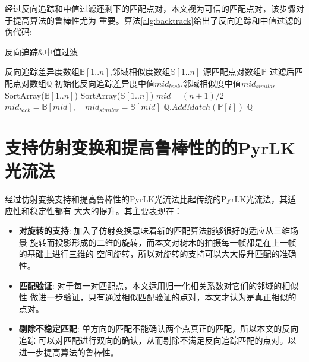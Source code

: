 经过反向追踪和中值过滤还剩下的匹配点对，本文视为可信的匹配点对，该步骤对于提高算法的鲁棒性尤为
重要。算法\ref{alg:backtrack}给出了反向追踪和中值过滤的伪代码:\\
\begin{algorithm}[H]
	\caption{反向追踪\&中值过滤}
	\label{alg:backtrack}
	\begin{algorithmic}[1]
	\Require 反向追踪差异度数组$\mathbb{B}[1..n]$,邻域相似度数组$\mathbb{S}[1..n]$
	\Require 源匹配点对数组$\mathbb{P}$
	\Ensure 过滤后匹配点对数组$\mathbb{Q}$
	\State 初始化反向追踪差异度中值$mid_{back}$,邻域相似度中值$mid_{similar}$
	\State SortArray($\mathbb{B}[1..n]$)
	\State SortArray($\mathbb{S}[1..n]$)
	\State $mid=(n+1)/2$
	\State $mid_{back}=\mathbb{B}[mid],\quad mid_{similar}=\mathbb{S}[mid]$
		\State $\mathbb{Q}.AddMatch(\mathbb{P}[i])$
	\EndIf
	\EndFor
	\State \Return $\mathbb{Q}$
	\end{algorithmic}
\end{algorithm}

\section{支持仿射变换和提高鲁棒性的的PyrLK光流法}
经过仿射变换支持和提高鲁棒性的PyrLK光流法比起传统的PyrLK光流法，其适应性和稳定性都有
大大的提升。其主要表现在：\\
\begin{itemize}
	\item \textbf{对旋转的支持}: 加入了仿射变换意味着新的匹配算法能够很好的适应从三维场景
		旋转而投影形成的二维的旋转，而本文对树木的拍摄每一帧都是在上一帧的基础上进行三维的
		空间旋转，所以对旋转的支持可以大大提升匹配的准确性。
	\item \textbf{匹配验证}: 对于每一对匹配点，本文运用归一化相关系数对它们的邻域的相似性
		做进一步验证，只有通过相似匹配验证的点对，本文才认为是真正相似的点对。
	\item \textbf{剔除不稳定匹配}: 单方向的匹配不能确认两个点真正的匹配，所以本文的反向追踪
		可以对匹配进行双向的确认，从而剔除不满足反向追踪匹配的点对。以进一步提高算法的鲁棒性。
\end{itemize}

